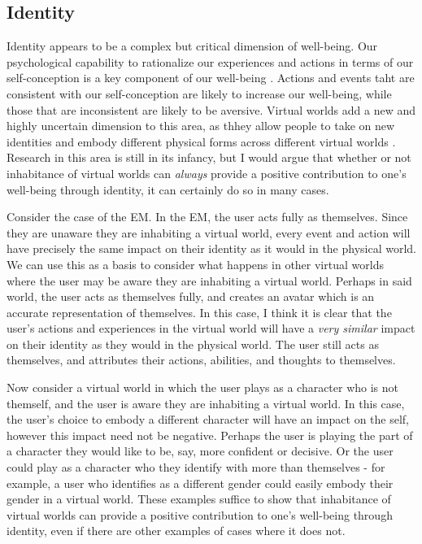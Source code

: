 \subsection{Identity}
Identity appears to be a complex but critical dimension of well-being. Our
psychological capability to rationalize our experiences and actions in terms of
our self-conception is a key component of our well-being \citep{McAdams2013}.
Actions and events taht are consistent with our self-conception are likely to
increase our well-being, while those that are inconsistent are likely to be
aversive. Virtual worlds add a new and highly uncertain dimension to this area,
as thhey allow people to take on new identities and embody different physical 
forms across different virtual worlds \citep{Lin2022}. Research in this area is
still in its infancy, but I would argue that whether or not inhabitance of
virtual worlds can \emph{always} provide a positive contribution to one's
well-being through identity, it can certainly do so in many cases.

Consider the case of the EM. In the EM, the user acts fully as themselves. Since
they are unaware they are inhabiting a virtual world, every event and action
will have precisely the same impact on their identity as it would in the
physical world. We can use this as a basis to consider what happens in other 
virtual worlds where the user may be aware they are inhabiting a virtual world. 
Perhaps in said world, the user acts as themselves fully, and creates an avatar
which is an accurate representation of themselves. In this case, I think it is
clear that the user's actions and experiences in the virtual world will have a 
\emph{very similar} impact on their identity as they would in the physical
world. The user still acts as themselves, and attributes their actions,
abilities, and thoughts to themselves.

Now consider a virtual world in which the user plays as a character who is not
themself, and the user is aware they are inhabiting a virtual world. In this
case, the user's choice to embody a different character will have an impact on
the self, however this impact need not be negative. Perhaps the user is playing
the part of a character they would like to be, say, more confident or decisive.
Or the user could play as a character who they identify with more than
themselves - for example, a user who identifies as a different gender could
easily embody their gender in a virtual world. These examples suffice to show 
that inhabitance of virtual worlds can provide a positive contribution to one's
well-being through identity, even if there are other examples of cases where it
does not.